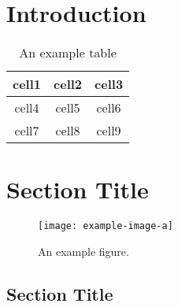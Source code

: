 \documentclass[master]{NTHUthesis}
\begin{document}
\makecover


\begin{abstractZH}

\end{abstractZH}

\begin{acknowledgementsZH}

\end{acknowledgementsZH}

\begin{abstractEN}

\end{abstractEN}

\begin{acknowledgementsEN}

\end{acknowledgementsEN}

\maketoc

\listofalgorithms
{}
\clearpage


\chapter{Introduction}
\lipsum[1-3]
\begin{table}[t]
    \centering
    \begin{tabular}{ c | c c }
    \toprule
     cell1 & cell2 & cell3 \\
    \midrule
     cell4 & cell5 & cell6 \\  
     cell7 & cell8 & cell9 \\
    \bottomrule
    \end{tabular}
    \caption{An example table}
    \label{tab:my_label}
\end{table}

\chapter{Section Title}
\lipsum[1-3]
\begin{figure}
    \centering
    \texttt{[image: example-image-a]}
    \caption{An example figure.}
    \label{fig:example-a}
\end{figure}

\section{Section Title}
\lipsum[4-5]
\end{document}
